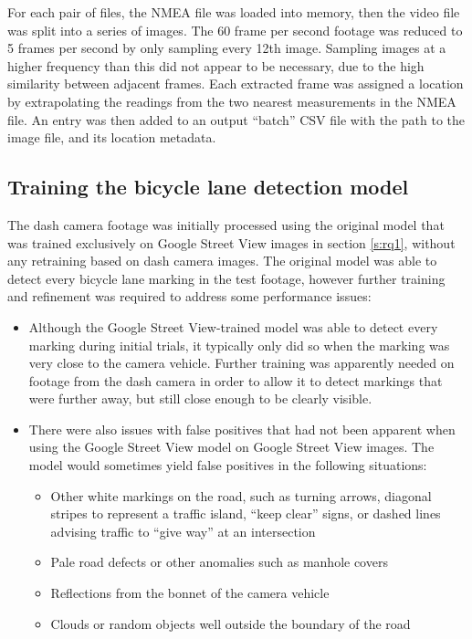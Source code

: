 \documentclass[11pt,twoside]{report}
\begin{document}
For each pair of files, the NMEA file was loaded into memory, then the video file was split into a series of images.  The 60 frame per second footage was reduced to 5 frames per second by only sampling every 12th image.  Sampling images at a higher frequency than this did not appear to be necessary, due to the high similarity between adjacent frames.  Each extracted frame was assigned a location by extrapolating the readings from the two nearest measurements in the NMEA file.  An entry was then added to an output ``batch'' CSV file with the path to the image file, and its location metadata.


\subsection{Training the bicycle lane detection model}
\label{rq3c}

The dash camera footage was initially processed using the original model that was trained exclusively on Google Street View images in section \ref{s:rq1}, without any retraining based on dash camera images.  The original model was able to detect every bicycle lane marking in the test footage, however further training and refinement was required to address some performance issues:

\begin{itemize}
\item{Although the Google Street View-trained model was able to detect every marking during initial trials, it typically only did so when the marking was very close to the camera vehicle.  Further training was apparently needed on footage from the dash camera in order to allow it to detect markings that were further away, but still close enough to be clearly visible.}
\item{There were also issues with false positives that had not been apparent when using the Google Street View model on Google Street View images.  The model would sometimes yield false positives in the following situations:

	\begin{itemize}
	\item{Other white markings on the road, such as turning arrows, diagonal stripes to represent a traffic island, ``keep clear'' signs, or dashed lines advising traffic to ``give way'' at an intersection}
	\item{Pale road defects or other anomalies such as manhole covers}
	\item{Reflections from the bonnet of the camera vehicle}
	\item{Clouds or random objects well outside the boundary of the road}
	\end{itemize}
}
\end{itemize}
\end{document}
